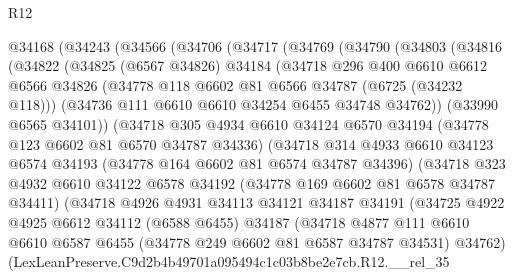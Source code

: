 \begin{lexlean}{R12}
\begin{coremodule}
  @34168
    (@34243
      (@34566
        (@34706
          (@34717
            (@34769
              (@34790
                (@34803
                  (@34816
                    (@34822
                      (@34825
                        (@6567 @34826)
                        @34184
                        (@34718
                          @296
                          @400
                          @6610
                          @6612
                          @6566
                          @34826
                          (@34778 @118 @6602 @81 @6566 @34787 (@6725 (@34232 @118)))
                          (@34736 @111 @6610 @6610 @34254 @6455 @34748 @34762))
                        (@33990 @6565 @34101))
                      (@34718
                        @305
                        @4934
                        @6610
                        @34124
                        @6570
                        @34194
                        (@34778 @123 @6602 @81 @6570 @34787 @34336)
                        (@34718
                          @314
                          @4933
                          @6610
                          @34123
                          @6574
                          @34193
                          (@34778 @164 @6602 @81 @6574 @34787 @34396)
                          (@34718
                            @323
                            @4932
                            @6610
                            @34122
                            @6578
                            @34192
                            (@34778 @169 @6602 @81 @6578 @34787 @34411)
                            (@34718
                              @4926
                              @4931
                              @34113
                              @34121
                              @34187
                              @34191
                              (@34725
                                @4922
                                @4925
                                @6612
                                @34112
                                (@6588 @6455)
                                @34187
                                (@34718
                                  @4877
                                  @111
                                  @6610
                                  @6610
                                  @6587
                                  @6455
                                  (@34778 @249 @6602 @81 @6587 @34787 @34531)
                                  @34762)
                                (LexLeanPreserve.C9d2b4b49701a095494c1c03b8be2e7cb.R12.__rel_35

\end{coremodule}
\end{lexlean}
